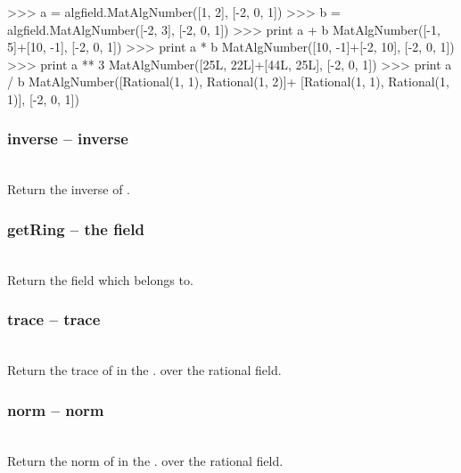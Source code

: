 \begin{ex}
>>> a = algfield.MatAlgNumber([1, 2], [-2, 0, 1])
>>> b = algfield.MatAlgNumber([-2, 3], [-2, 0, 1])
>>> print a + b
MatAlgNumber([-1, 5]+[10, -1], [-2, 0, 1])
>>> print a * b
MatAlgNumber([10, -1]+[-2, 10], [-2, 0, 1])
>>> print a ** 3
MatAlgNumber([25L, 22L]+[44L, 25L], [-2, 0, 1])
>>> print a / b
MatAlgNumber([Rational(1, 1), Rational(1, 2)]+
[Rational(1, 1), Rational(1, 1)], [-2, 0, 1])
\end{ex}%
\C
  \method
  \subsubsection{inverse -- inverse}
  \\
  \spacing
  \quad Return the inverse of . \\
%
  \subsubsection{getRing -- the field}
  \\
  \spacing
  \quad Return the field which  belongs to. \\  
%
  \subsubsection{trace -- trace}
  \\
  \spacing
  \quad Return the trace of  in the . over the rational field. \\
%
  \subsubsection{norm -- norm}
  \\
  \spacing
  \quad Return the norm of  in the . over the rational field. \\
%
